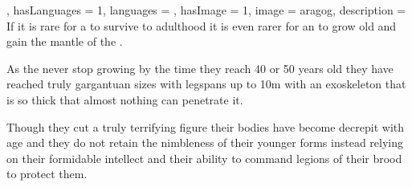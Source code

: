 {{

, hasLanguages = 1, languages = , hasImage = 1, image = aragog, description = If it is rare for a  to survive to adulthood\comma{} it is even rarer for an  to grow old\comma{} and gain the mantle of the . 

As the  never stop growing\comma{} by the time they reach 40 or 50 years old\comma{} they have reached truly gargantuan sizes\comma{} with legspans up to 10m\comma{} with an exoskeleton that is so thick that almost nothing can penetrate it. 

Though they cut a truly terrifying figure\comma{} their bodies have become decrepit with age\comma{} and they do not retain the nimbleness of their younger forms\comma{} instead relying on their formidable intellect and their ability to command legions of their brood to protect them.}

}




